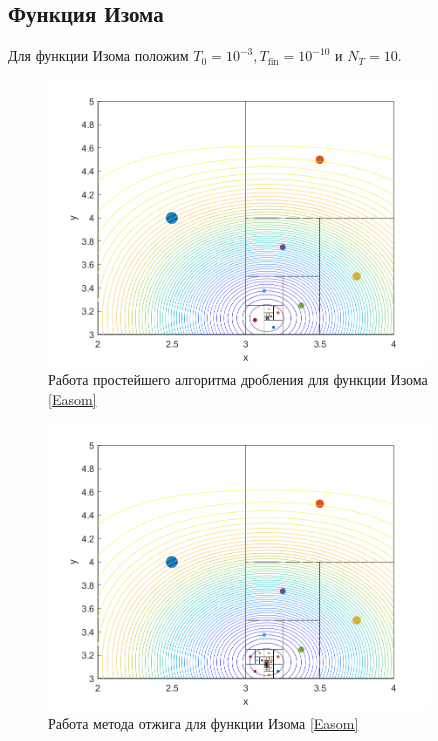 \subsection{Функция Изома}
Для функции Изома положим $T_0=10^{-3}, T_{\mathrm{fin}}=10^{-10}$ и $N_T=10$.
\begin{figure}[H]
\centering
\includegraphics[width=0.9\textwidth]{Graphics/TrivialDivide_Easom_algo.png}
\caption{Работа простейшего алгоритма дробления для функции Изома \eqref{Easom}} 
\end{figure}
\begin{figure}[H]
\centering
\includegraphics[width=0.9\textwidth]{Graphics/SimAnnealing_Easom_algo.png}
\caption{Работа метода отжига для функции Изома \eqref{Easom}} 
\end{figure}
